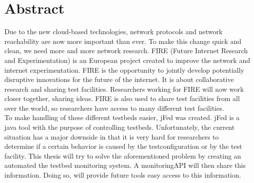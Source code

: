 \newpage
\chapter*{Abstract}
\npar
Due to the new cloud-based technologies, network protocols and network reachability are now more important than ever. To make this change quick and clean, we need more and more network research. FIRE (Future Internet Research and Experimentation) is an European project created to improve the network and internet experimentation. FIRE is the opportunity to jointly develop potentially disruptive innovations for the future of the internet. It is about collaborative research and sharing test facilities. Researchers working for FIRE will now work closer together, sharing ideas. FIRE is also used to share test facilities from all over the world, so researchers have access to many different test facilities.\\

To make handling of these different testbeds easier, jFed was created. jFed is a java tool with the purpose of controlling testbeds. Unfortunately, the current situation has a major downside in that it is very hard for researchers to determine if a certain behavior is caused by the testconfiguration or by the test facility. 
\npar
This thesis will try to solve the aforementioned problem by creating an automated the testbed monitoring system. A monitoringAPI will then share this information. Doing so, will provide future tools easy access to this information.